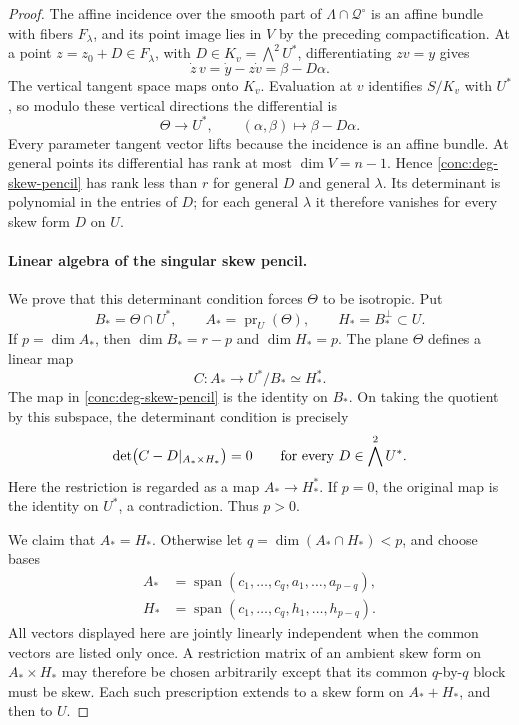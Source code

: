 \begin{proof}
The affine incidence over the smooth part of
\(\Lambda\cap\mathcal Q^\circ\) is an affine bundle with
fibers \(F_\lambda\), and its point image lies in \(V\) by
the preceding compactification.  At a point
\(z=z_0+D\in F_\lambda\), with
\(D\in K_v=\bigwedge^2U^*\), differentiating \(zv=y\)
gives
\[
 \dot z\,v=\dot y-z\dot v=\beta-D\alpha.
\]
The vertical tangent space maps onto \(K_v\).  Evaluation at
\(v\) identifies \(S/K_v\) with \(U^*\), so modulo these
vertical directions the differential is
\begin{equation}
 \Theta\longrightarrow U^*,
 \qquad (\alpha,\beta)\longmapsto\beta-D\alpha.
 \label{conc:deg-skew-pencil}
\end{equation}
Every parameter tangent vector lifts because the incidence is an
affine bundle.  At general points its differential has rank at
most \(\dim V=n-1\).  Hence \eqref{conc:deg-skew-pencil}
has rank less than \(r\) for general \(D\) and general
\(\lambda\).  Its determinant is polynomial in the entries of
\(D\); for each general \(\lambda\) it therefore vanishes
for every skew form \(D\) on \(U\).

\paragraph{Linear algebra of the singular skew pencil.}
We prove that this determinant condition forces \(\Theta\)
to be isotropic.  Put
\[
 B_*=\Theta\cap U^*,\qquad
 A_*=\operatorname{pr}_U(\Theta),\qquad
 H_*=B_*^\perp\subset U.
\]
If \(p=\dim A_*\), then \(\dim B_*=r-p\) and
\(\dim H_*=p\).  The plane \(\Theta\) defines a linear map
\[
 C:A_*\longrightarrow U^*/B_*\simeq H_*^*.
\]
The map in \eqref{conc:deg-skew-pencil} is the identity on
\(B_*\).  On taking the quotient by this subspace, the
determinant condition is precisely
\begin{equation}
 \det\bigl(C-D|_{A_*\times H_*}\bigr)=0
 \qquad\hbox{for every }D\in\bigwedge^2U^*.
 \label{conc:deg-quotient-pencil}
\end{equation}
Here the restriction is regarded as a map \(A_*\to H_*^*\).
If \(p=0\), the original map is the identity on \(U^*\),
a contradiction.  Thus \(p>0\).

We claim that \(A_*=H_*\).  Otherwise let
\(q=\dim(A_*\cap H_*)<p\), and choose bases
\[
 \begin{split}
 A_*&=\operatorname{span}(c_1,\ldots,c_q,a_1,\ldots,a_{p-q}),\\
 H_*&=\operatorname{span}(c_1,\ldots,c_q,h_1,\ldots,h_{p-q}).
 \end{split}
\]
All vectors displayed here are jointly linearly independent when
the common vectors are listed only once.  A restriction matrix of
an ambient skew form on \(A_*\times H_*\) may therefore be
chosen arbitrarily except that its common \(q\)-by-\(q\)
block must be skew.  Each such prescription extends to a skew
form on \(A_*+H_*\), and then to \(U\).


\end{proof}
